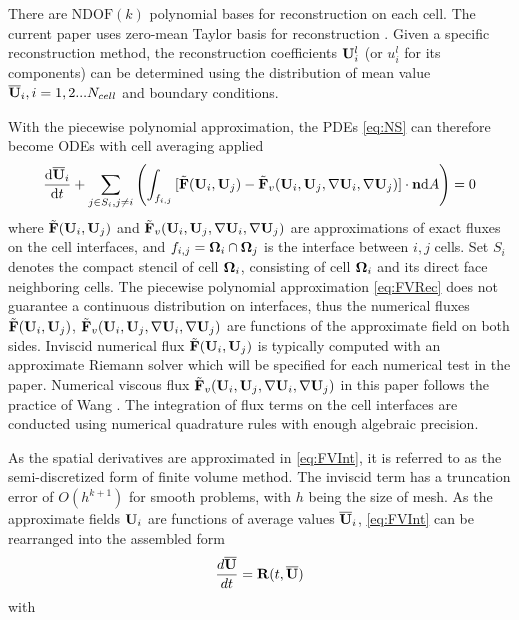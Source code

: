 \documentclass[preprint,12pt]{elsarticle}
\begin{document}
There are $\mathrm{NDOF}(k)$ polynomial bases for reconstruction on
each cell.
The current paper uses zero-mean Taylor basis
for reconstruction \cite{wang2017compact_VR}.
Given a specific reconstruction method,
the reconstruction coefficients $\mathbf{U}_i^l$ (or $u_i^l$ for 
its components) can be determined using
the distribution of mean value $\overline{\mathbf{U}}_i, i=1,2...N_{cell}$
and boundary conditions.

With the piecewise polynomial approximation,
the PDEs \eqref{eq:NS} can therefore become ODEs
with cell averaging applied
\begin{equation}
    \label{eq:FVInt}
    \frac{\dd\overline{\mathbf{U}}_i}{\dd t}
    +\sum_{j\in S_i, j\neq i}{\left(
        \int_{f_{i,j}}{
            [\tilde{\mathbf{F}}(\mathbf{U}_i,\mathbf{U}_j) - \tilde{\mathbf{F}}_v(\mathbf{U}_i,\mathbf{U}_j, \nabla \mathbf{U}_i, \nabla \mathbf{U}_j)] \cdot \mathbf{n}  \dd A
        }\right)
    }
    = 0
\end{equation}
where $\tilde{\mathbf{F}}(\mathbf{U}_i,\mathbf{U}_j)$ and $\tilde{\mathbf{F}}_v(\mathbf{U}_i,\mathbf{U}_j, \nabla \mathbf{U}_i, \nabla \mathbf{U}_j)$ are approximations
of exact fluxes on the cell interfaces,
and $f_{i,j}=\mathbf{\Omega}_i \cap \mathbf{\Omega}_j$ is the interface between $i,j$ cells.
Set $S_i$ denotes the compact stencil of cell $\mathbf{\Omega}_{i}$, consisting 
of cell $\mathbf{\Omega}_{i}$ and its direct face neighboring cells.
The piecewise polynomial approximation \eqref{eq:FVRec} does not
guarantee a continuous distribution on interfaces,
thus the numerical fluxes
$\tilde{\mathbf{F}}(\mathbf{U}_i,\mathbf{U}_j)$, $\tilde{\mathbf{F}}_v(\mathbf{U}_i,\mathbf{U}_j, \nabla \mathbf{U}_i, \nabla \mathbf{U}_j)$ are
functions of the approximate field on both sides. Inviscid numerical
flux $\tilde{\mathbf{F}}(\mathbf{U}_i,\mathbf{U}_j)$ is typically computed with an approximate Riemann solver which
will be specified for each numerical test in the paper.
Numerical viscous flux $\tilde{\mathbf{F}}_v(\mathbf{U}_i,\mathbf{U}_j, \nabla \mathbf{U}_i, \nabla \mathbf{U}_j)$
in this paper follows the practice of Wang \cite{wang2017compact_VR}.
The integration of flux terms on the cell interfaces
are conducted using numerical quadrature rules with
enough algebraic precision.

As the spatial derivatives are approximated in \eqref{eq:FVInt},
it is referred to as the semi-discretized form of finite volume method.
The inviscid term has a truncation error of $O(h^{k+1})$ for smooth problems,
with $h$ being the size of mesh. As the approximate fields $\mathbf{U}_i$ are functions
of average values $\overline{\mathbf{U}}_i$, \eqref{eq:FVInt} can be rearranged into the
assembled form
\begin{equation}
    \label{eq:FVODE}
    \frac{d\overline{\mathbf{U}}}{dt} = \mathbf{R}(t, \overline{\mathbf{U}})
\end{equation}
with
\end{document}

